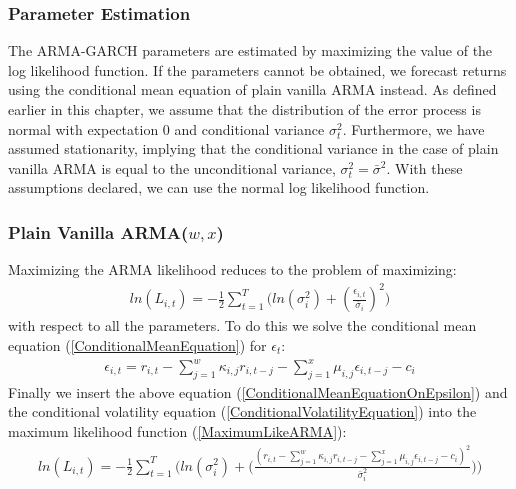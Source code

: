\subsubsection{Parameter Estimation}

The ARMA-GARCH parameters are estimated by maximizing the value of the log likelihood function. If the parameters cannot be obtained, we forecast returns using the conditional mean equation of plain vanilla ARMA instead. As defined earlier in this chapter, we assume that the distribution of the error process is normal with expectation 0 and conditional variance ${\sigma_t^2}$. Furthermore, we have assumed stationarity, implying that the conditional variance in the case of plain vanilla ARMA is equal to the unconditional variance, ${\sigma_t^2=\bar\sigma^2}$. With these assumptions declared, we can use the normal log likelihood function.

\subsubsection{Plain Vanilla ARMA($w,x$)}

Maximizing the ARMA likelihood reduces to the problem of maximizing:
\begin{align} 
    ln(L_{i,t})=-\frac{1}{2}\sum_{t=1}^T\bigg( ln(\sigma_{i}^2)+(\frac{\epsilon_{i,t}}{\bar\sigma_i})^2\bigg)  \label{MaximumLikeARMA}
\end{align}
with respect to all the parameters. To do this we solve the conditional mean equation (\ref{ConditionalMeanEquation}) for $\epsilon_t$:
\begin{align}
     \epsilon_{i,t}=r_{i,t}-\sum_{j=1}^w\kappa_{i,j} r_{i,t-j}-\sum_{j=1}^x\mu_{i,j} \epsilon_{i,t-j}-c_i \label{ConditionalMeanEquationOnEpsilon}
\end{align}
Finally we insert the above equation (\ref{ConditionalMeanEquationOnEpsilon}) and the conditional volatility equation (\ref{ConditionalVolatilityEquation}) into the maximum likelihood function (\ref{MaximumLikeARMA}):
\begin{align} 
    ln(L_{i,t})=-\frac{1}{2}\sum_{t=1}^T\Bigg( ln(\sigma_i^2)+\Big(\frac{(r_{i,t}-\sum_{j=1}^w\kappa_{i,j} r_{i,t-j}-\sum_{j=1}^x\mu_{i,j} \epsilon_{i,t-j}-c_i)^2}{\bar\sigma_i^2}\Big)\Bigg)  \label{fullMaximumLikeARMA}
\end{align}

